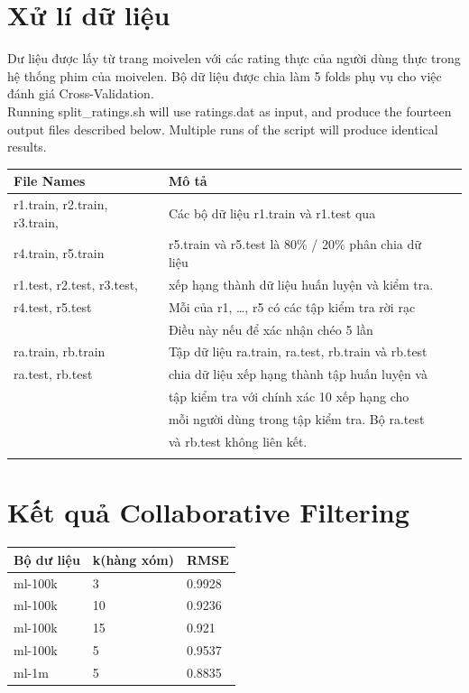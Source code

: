 \documentclass[a4paper,10pt]{report}
\begin{document}
\section{Xử lí dữ liệu}
Dư liệu được lấy từ  trang moivelen với các rating thực của người dùng thực trong hệ thống phim của moivelen. Bộ dữ liệu được chia làm 5 folds phụ vụ cho việc đánh giá Cross-Validation. \\
Running split\_ratings.sh will use ratings.dat as input, and produce the fourteen output files described below. Multiple runs of the script will produce identical results. \\
\begin{center}
\begin{longtable}{|l|l|l|} 
\hline
File Names & Mô tả  \\
\hline
r1.train, r2.train, r3.train, & Các bộ dữ liệu r1.train và r1.test qua \\
r4.train, r5.train &  r5.train và r5.test là 80\% / 20\% phân chia dữ liệu \\
r1.test, r2.test, r3.test, & xếp hạng thành dữ liệu huấn luyện và kiểm tra. \\
r4.test, r5.test & Mỗi của r1, \ldots, r5 có các tập kiểm tra rời rạc \\
& Điều này nếu để xác nhận chéo 5 lần \\
\hline
ra.train, rb.train & Tập dữ liệu ra.train, ra.test, rb.train và rb.test\\ 
ra.test, rb.test & chia dữ liệu xếp hạng thành tập huấn luyện và \\
				& tập kiểm tra với chính xác 10 xếp hạng cho\\
				&  mỗi người dùng trong tập kiểm tra. Bộ ra.test \\
				&  và rb.test không liên kết.\\
				& \\
				\hline
\end{longtable}
\end{center}
\newpage
\section{Kết quả Collaborative Filtering}
\begin{center}
\begin{longtable}{|l|l|l|}
\hline
Bộ dư liệu & k(hàng xóm) & RMSE \\ 
\hline
ml-100k & 3 &  0.9928 \\
ml-100k & 10 &  0.9236\\
ml-100k & 15 &  0.921\\
ml-100k & 5 & 0.9537 \\
ml-1m & 5 & 0.8835 \\
\hline
\end{longtable}
\end{center}
\end{document}
